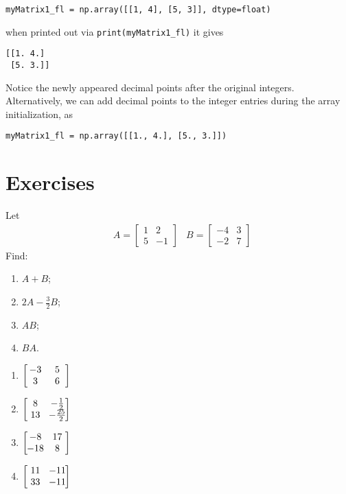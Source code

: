 \begin{lstlisting}
myMatrix1_fl = np.array([[1, 4], [5, 3]], dtype=float)
\end{lstlisting}
when printed out via \verb|print(myMatrix1_fl)| it gives
\begin{lstlisting}
[[1. 4.]
 [5. 3.]]    
\end{lstlisting}
Notice the newly appeared decimal points after the original integers. Alternatively, we can add decimal points to the integer entries during the array initialization, as
\begin{lstlisting}
myMatrix1_fl = np.array([[1., 4.], [5., 3.]])
\end{lstlisting}

\section{Exercises}
\begin{Exercise}
Let 
\begin{align*}
& A =
\begin{bmatrix}
1 & 2 \\
5 & -1 
\end{bmatrix}
& B =
\begin{bmatrix}
-4 & 3 \\
-2 & 7 
\end{bmatrix}
\end{align*}
Find:
\begin{enumerate}[label=(\alph*)]
\item $A+B$;
\item $2A-\frac{3}{2}B$;
\item $AB$;
\item $BA$.
\end{enumerate}
\end{Exercise}
\begin{Answer}
\begin{enumerate}[label=(\alph*)]
\item $\left[\begin{array}{@{\,}wc{13pt}wc{13pt}@{\,}}
-3 & 5 \\
3 & 6 \\
\end{array}\right]$
\item $\left[\begin{array}{@{\,}wc{13pt}wc{13pt}@{\,}}
8 & -\frac{1}{2} \\
13 & -\frac{25}{2} \\
\end{array}\right]$
\item $\left[\begin{array}{@{\,}wc{13pt}wc{13pt}@{\,}}
-8 & 17 \\
-18 & 8 \\
\end{array}\right]$
\item $\left[\begin{array}{@{\,}wc{13pt}wc{13pt}@{\,}}
11 & -11 \\
33 & -11 \\
\end{array}\right]$
\end{enumerate}   
\end{Answer}

